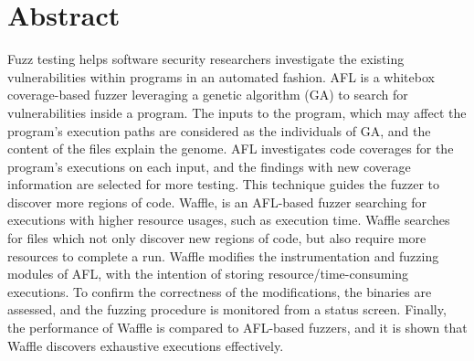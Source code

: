 \doublespacing
\chapter*{Abstract}

Fuzz testing helps software security researchers investigate the existing vulnerabilities within programs in an automated fashion. AFL is a whitebox coverage-based fuzzer leveraging a genetic algorithm (GA) to search for vulnerabilities inside a program. The inputs to the program, which may affect the program's execution paths are considered as the individuals of GA, and the content of the files explain the genome. AFL investigates code coverages for the program's executions on each input, and the findings with new coverage information are selected for more testing. This technique guides the fuzzer to discover more regions of code. Waffle, is an AFL-based fuzzer searching for executions with higher resource usages, such as execution time. Waffle searches for files which not only discover new regions of code, but also require more resources to complete a run. Waffle modifies the instrumentation and fuzzing modules of AFL, with the intention of storing resource/time-consuming executions. To confirm the correctness of the modifications, the binaries are assessed, and the fuzzing procedure is monitored from a status screen. Finally, the performance of Waffle is compared to AFL-based fuzzers, and it is shown that Waffle discovers exhaustive executions effectively.